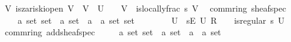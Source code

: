 \documentclass[12pt]{scrartcl}
\begin{document}
\begin{isabelle}
\ \ {\isacharparenleft}{\kern0pt}{\isasymexists}V{\isachardot}{\kern0pt}\ is{\isacharunderscore}{\kern0pt}zariski{\isacharunderscore}{\kern0pt}open\ V\ {\isasymand}\ V\ {\isasymsubseteq}\ U\ {\isasymand}\ {\isasympp}\ {\isasymin}\ V\ {\isasymand}\ {\isacharparenleft}{\kern0pt}is{\isacharunderscore}{\kern0pt}locally{\isacharunderscore}{\kern0pt}frac\ s\ V{\isacharparenright}{\kern0pt}{\isacharparenright}{\kern0pt}{\isachardoublequoteclose}\isanewline
\isanewline
{}\isamarkupfalse%
\ {\isacharparenleft}{\kern0pt}\ comm{\isacharunderscore}{\kern0pt}ring{\isacharparenright}{\kern0pt}\ sheaf{\isacharunderscore}{\kern0pt}spec\isanewline
\ \ \ \ {\isacharcolon}{\kern0pt}{\isacharcolon}{\kern0pt}\ {\isachardoublequoteopen}{\isacharprime}{\kern0pt}a\ set\ set\ {\isasymRightarrow}\ {\isacharparenleft}{\kern0pt}{\isacharprime}{\kern0pt}a\ set\ {\isasymRightarrow}\ {\isacharparenleft}{\kern0pt}{\isacharprime}{\kern0pt}a\ {\isasymtimes}\ {\isacharprime}{\kern0pt}a{\isacharparenright}{\kern0pt}\ set{\isacharparenright}{\kern0pt}\ set{\isachardoublequoteclose}\ {\isacharparenleft}{\kern0pt}{\isachardoublequoteopen}{\isasymO}\ {\isacharunderscore}{\kern0pt}{\isachardoublequoteclose}\ {\isacharbrackleft}{\kern0pt}{}{}{\isacharbrackright}{\kern0pt}\ {}{}{\isacharparenright}{\kern0pt}\isanewline
\ \ \ {\isachardoublequoteopen}{\isasymO}\ U\ {\isasymequiv}\ {\isacharbraceleft}{\kern0pt}s{\isasymin}{\isacharparenleft}{\kern0pt}{\isasymPi}\isactrlsub E\ {\isasympp}{\isasymin}U{\isachardot}{\kern0pt}\ {\isacharparenleft}{\kern0pt}R\isactrlbsub {\isasympp}\ {\isacharparenleft}{\kern0pt}{\isacharplus}{\kern0pt}{\isacharparenright}{\kern0pt}\ {\isacharparenleft}{\kern0pt}{\isasymcdot}{\isacharparenright}{\kern0pt}\ {\isasymzero}\isactrlesub {\isacharparenright}{\kern0pt}{\isacharparenright}{\kern0pt}{\isachardot}{\kern0pt}\ is{\isacharunderscore}{\kern0pt}regular\ s\ U{\isacharbraceright}{\kern0pt}{\isachardoublequoteclose}\isanewline
\isanewline
{}\isamarkupfalse%
\ {\isacharparenleft}{\kern0pt}\ comm{\isacharunderscore}{\kern0pt}ring{\isacharparenright}{\kern0pt}\ add{\isacharunderscore}{\kern0pt}sheaf{\isacharunderscore}{\kern0pt}spec\isanewline
\ \ \ \ {\isacharcolon}{\kern0pt}{\isacharcolon}{\kern0pt}\ {\isachardoublequoteopen}{\isacharparenleft}{\kern0pt}{\isacharprime}{\kern0pt}a\ set{\isacharparenright}{\kern0pt}\ set\ {\isasymRightarrow}\ {\isacharparenleft}{\kern0pt}{\isacharprime}{\kern0pt}a\ set\ {\isasymRightarrow}\ {\isacharparenleft}{\kern0pt}{\isacharprime}{\kern0pt}a\ {\isasymtimes}\ {\isacharprime}{\kern0pt}a{\isacharparenright}{\kern0pt}\ set{\isacharparenright}{\kern0pt}\ \isanewline

\end{isabelle}
\end{document}
